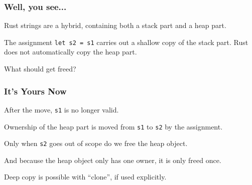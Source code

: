 \begin{frame}
\frametitle{Well, you see...}

Rust strings are a hybrid, containing both a stack part and a heap part.

\begin{center}
\end{center}

The assignment {\tt let s2 = s1} carries out a shallow copy of the stack part. Rust
does not automatically copy the heap part.

What should get freed?

\end{frame}



\begin{frame}
\frametitle{It's Yours Now}

After the move, {\tt s1} is no longer valid.


Ownership of the heap part is moved from {\tt s1} to {\tt s2} by the assignment.

Only when {\tt s2} goes out of scope do we free the heap object.


And because the heap object only has one owner, it is only freed once.

Deep copy is possible with ``clone'', if used explicitly.

\end{frame}


